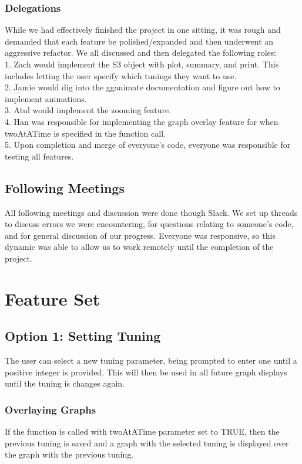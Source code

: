 \documentclass{article}
\begin{document}
\subsubsection{Delegations}
While we had effectively finished the project in one sitting, it was rough and demanded that each feature be polished/expanded and then underwent an aggressive refactor. We all discussed and then delegated the following roles:\\
1. Zach would implement the S3 object with plot, summary, and print. This includes letting the user specify which tunings they want to use.\\
2. Jamie would dig into the gganimate documentation and figure out how to implement animations.\\
3. Atul would implement the zooming feature.\\
4. Han was responsible for implementing the graph overlay feature for when twoAtATime is specified in the function call.\\
5. Upon completion and merge of everyone's code, everyone was responsible for testing all features.

\subsection{Following Meetings}
All following meetings and discussion were done though Slack. We set up threads to discuss errors we were encountering, for questions relating to someone's code, and for general discussion of our progress. Everyone was responsive, so this dynamic was able to allow us to work remotely until the completion of the project.

\section{Feature Set}
\subsection{Option 1: Setting Tuning}
The user can select a new tuning parameter, being prompted to enter one until a positive integer is provided. This will then be used in all future graph displays until the tuning is changes again.
\subsubsection{Overlaying Graphs}
If the function is called with twoAtATime parameter set to TRUE, then the previous tuning is saved and a graph with the selected tuning is displayed over the graph with the previous tuning.
\end{document}
